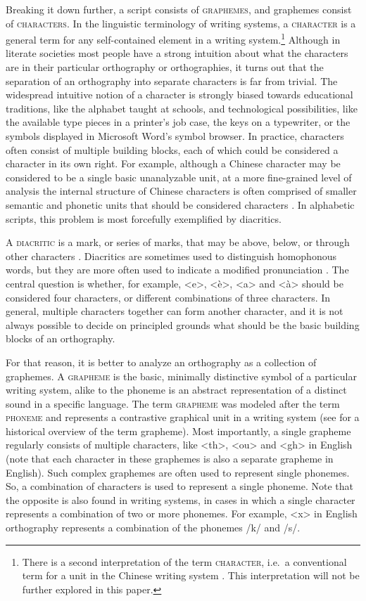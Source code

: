 Breaking it down further, a script consists of \textsc{graphemes}, and graphemes
consist of \textsc{characters}. In the linguistic terminology of writing
systems, a \textsc{character} is a general term for any self-contained element
in a writing system.\footnote{There is a second interpretation of the term
\textsc{character}, i.e.~a conventional term for a unit in the Chinese writing
system \citep{Daniels1996}. This interpretation will not be further explored in
this paper.} Although in literate societies most people have a strong intuition
about what the characters are in their particular orthography or orthographies,
it turns out that the separation of an orthography into separate characters is
far from trivial. The widespread intuitive notion of a character is strongly
biased towards educational traditions, like the alphabet taught at schools, and
technological possibilities, like the available type pieces in a printer's job
case, the keys on a typewriter, or the symbols displayed in Microsoft Word's
symbol browser. In practice, characters often consist of multiple building
blocks, each of which could be considered a character in its own right. For
example, although a Chinese character may be considered to be a single basic
unanalyzable unit, at a more fine-grained level of analysis the internal
structure of Chinese characters is often comprised of smaller semantic and
phonetic units that should be considered characters \citep{Sproat2000}. In
alphabetic scripts, this problem is most forcefully exemplified by diacritics. 

A \textsc{diacritic} is a mark, or series of marks, that may be above, below, or
through other characters \citep{Gaultney2002}. Diacritics are sometimes used to
distinguish homophonous words, but they are more often used to indicate a
modified pronunciation \citep[xli]{DanielsBright1996}. The central question is
whether, for example, <e>, <è>, <a> and <à> should be considered four
characters, or different combinations of three characters. In general, multiple
characters together can form another character, and it is not always possible to
decide on principled grounds what should be the basic building blocks of an
orthography.

For that reason, it is better to analyze an orthography as a collection of
graphemes. A \textsc{grapheme} is the basic, minimally distinctive symbol of a
particular writing system, alike to the phoneme is an abstract representation of
a distinct sound in a specific language. The term \textsc{grapheme} was modeled
after the term \textsc{phoneme} and represents a contrastive graphical unit in a
writing system (see \citealp{Kohrt1986} for a historical overview of the term
grapheme). Most importantly, a single grapheme regularly consists of multiple
characters, like <th>, <ou> and <gh> in English (note that each character in
these graphemes is also a separate grapheme in English). Such complex graphemes
are often used to represent single phonemes. So, a combination of characters is
used to represent a single phoneme. Note that the opposite is also found in
writing systems, in cases in which a single character represents a combination
of two or more phonemes. For example, <x> in English orthography represents a
combination of the phonemes /k/ and /s/. 

